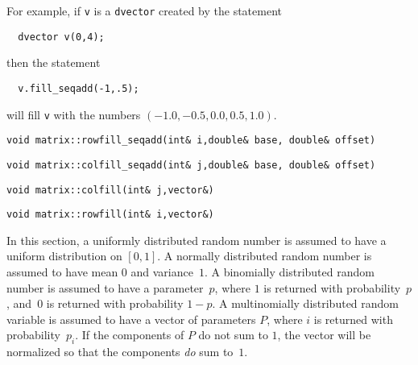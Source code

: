 \documentclass{admbmanual}
\begin{document}
For example, if \texttt{v} is a \texttt{dvector} created by the statement
\begin{lstlisting}
  dvector v(0,4);
\end{lstlisting}
then the statement
\begin{lstlisting}
  v.fill_seqadd(-1,.5);
\end{lstlisting}
will fill \texttt{v} with the numbers $(-1.0,-0.5,0.0,0.5,1.0)$.

\begin{lstlisting}
void matrix::rowfill_seqadd(int& i,double& base, double& offset)
\end{lstlisting}

\begin{lstlisting}
void matrix::colfill_seqadd(int& j,double& base, double& offset)
\end{lstlisting}

\begin{lstlisting}
void matrix::colfill(int& j,vector&)
\end{lstlisting}

\begin{lstlisting}
void matrix::rowfill(int& i,vector&)
\end{lstlisting}

In this section, a uniformly distributed random number is assumed to have
a uniform distribution on $[0,1]$. A normally distributed random number
is assumed to have mean $0$ and variance~$1$.
A binomially distributed random number is assumed to have a parameter~$p$,
where $1$ is returned with probability~$p$, and~$0$ is returned with
probability $1-p$.
A multinomially distributed random variable is assumed to have a vector
of parameters $P$, where $i$ is returned with probability~$p_i$.
If the components of $P$ do not sum to $1$, the vector will be normalized
so that the components \textit{do} sum to~$1$.
\end{document}
